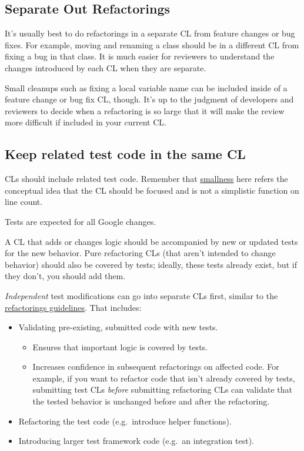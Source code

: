 \documentclass[
]{article}
\providecommand{\tightlist}{%
  \setlength{\itemsep}{0pt}\setlength{\parskip}{0pt}}
\begin{document}
\subsection{Separate Out Refactorings}\label{refactoring}

It's usually best to do refactorings in a separate CL from feature
changes or bug fixes. For example, moving and renaming a class should be
in a different CL from fixing a bug in that class. It is much easier for
reviewers to understand the changes introduced by each CL when they are
separate.

Small cleanups such as fixing a local variable name can be included
inside of a feature change or bug fix CL, though. It's up to the
judgment of developers and reviewers to decide when a refactoring is so
large that it will make the review more difficult if included in your
current CL.

\subsection{Keep related test code in the same CL}\label{test-code}

CLs should include related test code. Remember that
\hyperref[what-is-small]{smallness} here refers the conceptual idea that
the CL should be focused and is not a simplistic function on line count.

Tests are expected for all Google changes.

A CL that adds or changes logic should be accompanied by new or updated
tests for the new behavior. Pure refactoring CLs (that aren't intended
to change behavior) should also be covered by tests; ideally, these
tests already exist, but if they don't, you should add them.

\emph{Independent} test modifications can go into separate CLs first,
similar to the \hyperref[refactoring]{refactorings guidelines}. That
includes:

\begin{itemize}
\tightlist
\item
  Validating pre-existing, submitted code with new tests.

  \begin{itemize}
  \tightlist
  \item
    Ensures that important logic is covered by tests.
  \item
    Increases confidence in subsequent refactorings on affected code.
    For example, if you want to refactor code that isn't already covered
    by tests, submitting test CLs \emph{before} submitting refactoring
    CLs can validate that the tested behavior is unchanged before and
    after the refactoring.
  \end{itemize}
\item
  Refactoring the test code (e.g.~introduce helper functions).
\item
  Introducing larger test framework code (e.g.~an integration test).
\end{itemize}
\end{document}
